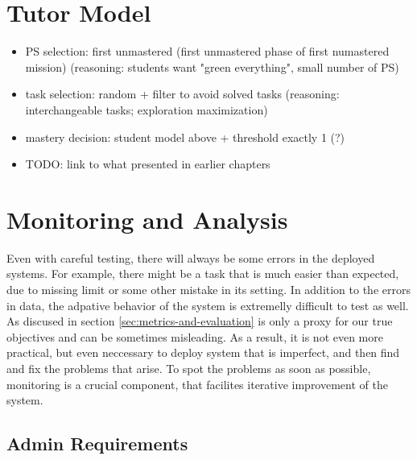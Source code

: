 \section{Tutor Model}

\begin{itemize}
\item PS selection: first unmastered
  (first unmastered phase of first numastered mission)
  (reasoning: students want "green everything", small number of PS)
\item task selection: random + filter to avoid solved tasks
  (reasoning: interchangeable tasks; exploration maximization)
\item mastery decision: student model above + threshold exactly 1 (?)
\item TODO: link to what presented in earlier chapters
\end{itemize}




\section{Monitoring and Analysis}
\label{sec:robomission.monitoring}

Even with careful testing, there will always be some errors in the deployed systems.
For example, there might be a task that is much easier than expected,
due to missing limit or some other mistake in its setting.
In addition to the errors in data,  %
the adpative behavior of the system is extremelly difficult to test as well.
As discused in section \ref{sec:metrics-and-evaluation} is only a proxy for our true objectives
and can be sometimes misleading.
As a result, it is not even more practical, but even neccessary to deploy system
that is imperfect, and then find and fix the problems that arise.
To spot the problems as soon as possible,
monitoring is a crucial component,
that facilites iterative improvement of the system.

\subsection{Admin Requirements}
\label{sec:admin-requirements}

